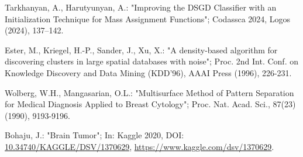 \documentclass[10pt,a4paper,oneside]{article}
\begin{document}
\begin{thebibliography}{}
{
Tarkhanyan, A., Harutyunyan, A.:
"Improving the DSGD Classifier with an Initialization Technique for Mass Assignment Functions";
Codassca 2024, Logos (2024), 137–142.

Ester, M., Kriegel, H.-P., Sander, J., Xu, X.:
"A density-based algorithm for discovering clusters in large spatial databases with noise";
Proc. 2nd Int. Conf. on Knowledge Discovery and Data Mining (KDD'96), AAAI Press (1996), 226-231.

Wolberg, W.H., Mangasarian, O.L.: "Multisurface Method of Pattern Separation for Medical Diagnosis Applied to Breast Cytology";
Proc. Nat. Acad. Sci., 87(23) (1990), 9193-9196.

Bohaju, J.: "Brain Tumor";
In: Kaggle 2020, DOI: \url{10.34740/KAGGLE/DSV/1370629}, \url{https://www.kaggle.com/dsv/1370629}.

}\end{thebibliography}
\end{document}
